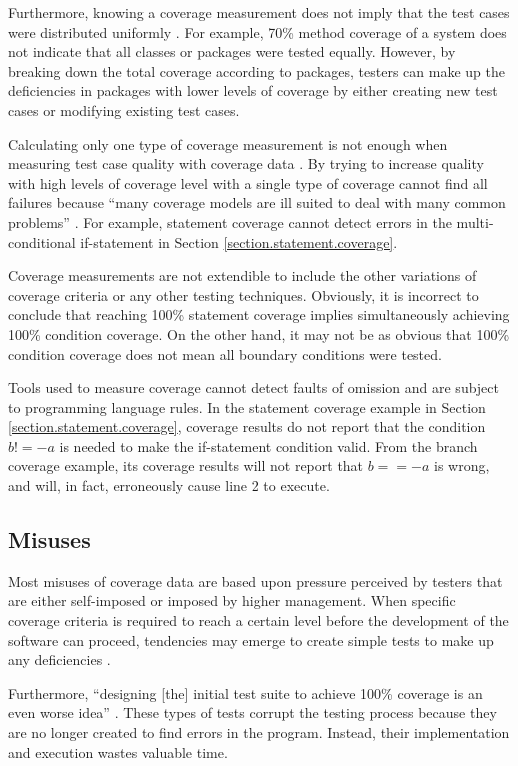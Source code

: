 Furthermore, knowing a coverage measurement does not imply that the test
cases were distributed uniformly \cite{Marick:1997}.  For example, 70\%
method coverage of a system does not indicate that all classes or packages
were tested equally.  However, by breaking down the total coverage
according to packages, testers can make up the deficiencies in packages
with lower levels of coverage by either creating new test cases or
modifying existing test cases.

Calculating only one type of coverage measurement is not enough when
measuring test case quality with coverage data \cite{Kaner:2002}.  By
trying to increase quality with high levels of coverage level with a single
type of coverage cannot find all failures because ``many coverage models
are ill suited to deal with many common problems'' \cite{Focus}.  For
example, statement coverage cannot detect errors in the multi-conditional
if-statement in Section \ref{section.statement.coverage}.

Coverage measurements are not extendible to include the other variations of
coverage criteria or any other testing techniques.  Obviously, it is
incorrect to conclude that reaching 100\% statement coverage implies
simultaneously achieving 100\% condition coverage.  On the other hand, it
may not be as obvious that 100\% condition coverage does not mean all
boundary conditions were tested.

Tools used to measure coverage cannot detect faults of omission
\cite{Marick:1997} and are subject to programming language rules.  In the
statement coverage example in Section \ref{section.statement.coverage},
coverage results do not report that the condition $b!=-a$ is needed to make
the if-statement condition valid.  From the branch coverage example, its
coverage results will not report that $b==-a$ is wrong, and will, in fact,
erroneously cause line 2 to execute.

\subsection{Misuses}
Most misuses of coverage data are based upon pressure perceived by testers
that are either self-imposed or imposed by higher management.  When
specific coverage criteria is required to reach a certain level before the
development of the software can proceed, tendencies may emerge to create
simple tests to make up any deficiencies \cite{Marick:1997}.

Furthermore, ``designing [the] initial test suite to achieve 100\% coverage
is an even worse idea'' \cite{Marick:1997}.  These types of tests corrupt
the testing process because they are no longer created to find errors in
the program.  Instead, their implementation and execution wastes valuable
time.

